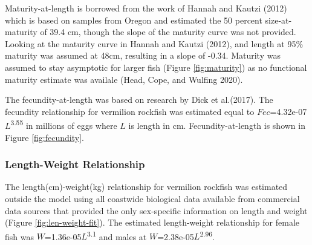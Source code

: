 \documentclass[11pt,
  english,
  a4paper,
]{article}
\begin{document}
\leavevmode\tagmcend\tagstructend


Maturity-at-length is borrowed from the work of Hannah and Kautzi {(2012)\leavevmode\tagmcend\tagstructend} which is based on samples from Oregon and estimated the 50 percent size-at-maturity of 39.4 cm, though the slope of the maturity curve was not provided. Looking at the maturity curve in Hannah and Kautzi {(2012)\leavevmode\tagmcend\tagstructend}, and length at 95\% maturity was assumed at 48cm, resulting in a slope of -0.34. Maturity was assumed to stay asymptotic for larger fish (Figure \ref{fig:maturity}) as no functional maturity estimate was availale {(Head, Cope, and Wulfing 2020)\leavevmode\tagmcend\tagstructend}.

\leavevmode\tagmcend\tagstructend\par


The fecundity-at-length was based on research by Dick et al.{(2017)\leavevmode\tagmcend\tagstructend}. The fecundity relationship for vermilion rockfish was estimated equal to {\(Fec\)\leavevmode\tagmcend\tagstructend}=4.32e-07{\(L\)\leavevmode\tagmcend\tagstructend}\textsuperscript{3.55} in millions of eggs where {\(L\)\leavevmode\tagmcend\tagstructend} is length in cm. Fecundity-at-length is shown in Figure \ref{fig:fecundity}.

\leavevmode\tagmcend\tagstructend\par


\hypertarget{length-weight-relationship}{%
\subsubsection{Length-Weight Relationship}\label{length-weight-relationship}}

\leavevmode\tagmcend\tagstructend


The length(cm)-weight(kg) relationship for vermilion rockfish was estimated outside the model using all coastwide biological data available from commercial data sources that provided the only sex-specific information on length and weight (Figure \ref{fig:len-weight-fit}). The estimated length-weight relationship for female fish was {\(W\)\leavevmode\tagmcend\tagstructend}=1.36e-05{\(L\)\leavevmode\tagmcend\tagstructend}\textsuperscript{3.1} and males at {\(W\)\leavevmode\tagmcend\tagstructend}=2.38e-05{\(L\)\leavevmode\tagmcend\tagstructend}\textsuperscript{2.96}.
\end{document}
